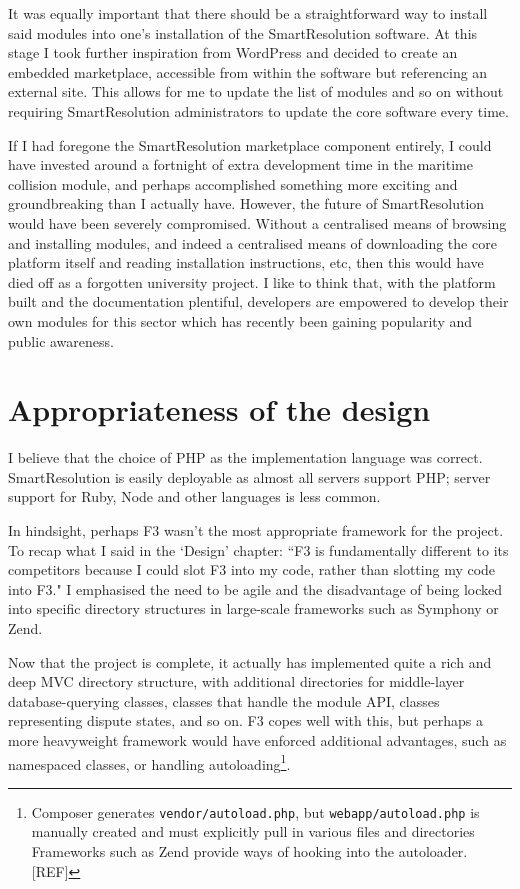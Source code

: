 It was equally important that there should be a straightforward way to install said modules into one's installation of the SmartResolution software. At this stage I took further inspiration from WordPress and decided to create an embedded marketplace, accessible from within the software but referencing an external site. This allows for me to update the list of modules and so on without requiring SmartResolution administrators to update the core software every time.

If I had foregone the SmartResolution marketplace component entirely, I could have invested around a fortnight of extra development time in the maritime collision module, and perhaps accomplished something more exciting and groundbreaking than I actually have. However, the future of SmartResolution would have been severely compromised. Without a centralised means of browsing and installing modules, and indeed a centralised means of downloading the core platform itself and reading installation instructions, etc, then this would have died off as a forgotten university project. I like to think that, with the platform built and the documentation plentiful, developers are empowered to develop their own modules for this sector which has recently been gaining popularity and public awareness.

\section{Appropriateness of the design}


I believe that the choice of PHP as the implementation language was correct. SmartResolution is easily deployable as almost all servers support PHP; server support for Ruby, Node and other languages is less common.

In hindsight, perhaps F3 wasn't the most appropriate framework for the project. To recap what I said in the `Design' chapter: ``F3 is fundamentally different to its competitors because I could slot F3 into my code, rather than slotting my code into F3." I emphasised the need to be agile and the disadvantage of being locked into specific directory structures in large-scale frameworks such as Symphony or Zend.

Now that the project is complete, it actually has implemented quite a rich and deep MVC directory structure, with additional directories for middle-layer database-querying classes, classes that handle the module API, classes representing dispute states, and so on. F3 copes well with this, but perhaps a more heavyweight framework would have enforced additional advantages, such as namespaced classes, or handling autoloading\footnote{Composer generates \lstinline{vendor/autoload.php}, but \lstinline{webapp/autoload.php} is manually created and must explicitly pull in various files and directories Frameworks such as Zend provide ways of hooking into the autoloader. [REF]}. %

